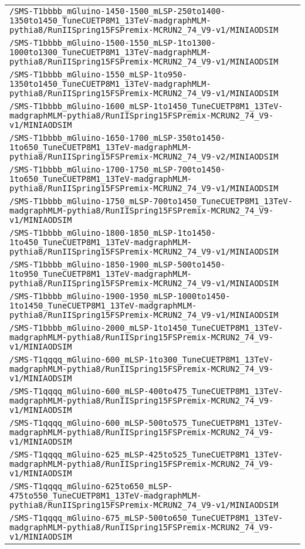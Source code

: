 \begin{center}
\begin{tabular}{l}
\verb!/SMS-T1bbbb_mGluino-1450-1500_mLSP-250to1400-1350to1450_TuneCUETP8M1_13TeV-madgraphMLM-pythia8/RunIISpring15FSPremix-MCRUN2_74_V9-v1/MINIAODSIM! \tabularnewline
\verb!/SMS-T1bbbb_mGluino-1500-1550_mLSP-1to1300-1000to1300_TuneCUETP8M1_13TeV-madgraphMLM-pythia8/RunIISpring15FSPremix-MCRUN2_74_V9-v1/MINIAODSIM! \tabularnewline
\verb!/SMS-T1bbbb_mGluino-1550_mLSP-1to950-1350to1450_TuneCUETP8M1_13TeV-madgraphMLM-pythia8/RunIISpring15FSPremix-MCRUN2_74_V9-v1/MINIAODSIM! \tabularnewline
\verb!/SMS-T1bbbb_mGluino-1600_mLSP-1to1450_TuneCUETP8M1_13TeV-madgraphMLM-pythia8/RunIISpring15FSPremix-MCRUN2_74_V9-v1/MINIAODSIM! \tabularnewline
\verb!/SMS-T1bbbb_mGluino-1650-1700_mLSP-350to1450-1to650_TuneCUETP8M1_13TeV-madgraphMLM-pythia8/RunIISpring15FSPremix-MCRUN2_74_V9-v2/MINIAODSIM! \tabularnewline
\verb!/SMS-T1bbbb_mGluino-1700-1750_mLSP-700to1450-1to650_TuneCUETP8M1_13TeV-madgraphMLM-pythia8/RunIISpring15FSPremix-MCRUN2_74_V9-v1/MINIAODSIM! \tabularnewline
\verb!/SMS-T1bbbb_mGluino-1750_mLSP-700to1450_TuneCUETP8M1_13TeV-madgraphMLM-pythia8/RunIISpring15FSPremix-MCRUN2_74_V9-v1/MINIAODSIM! \tabularnewline
\verb!/SMS-T1bbbb_mGluino-1800-1850_mLSP-1to1450-1to450_TuneCUETP8M1_13TeV-madgraphMLM-pythia8/RunIISpring15FSPremix-MCRUN2_74_V9-v1/MINIAODSIM! \tabularnewline
\verb!/SMS-T1bbbb_mGluino-1850-1900_mLSP-500to1450-1to950_TuneCUETP8M1_13TeV-madgraphMLM-pythia8/RunIISpring15FSPremix-MCRUN2_74_V9-v1/MINIAODSIM! \tabularnewline
\verb!/SMS-T1bbbb_mGluino-1900-1950_mLSP-1000to1450-1to1450_TuneCUETP8M1_13TeV-madgraphMLM-pythia8/RunIISpring15FSPremix-MCRUN2_74_V9-v1/MINIAODSIM! \tabularnewline
\verb!/SMS-T1bbbb_mGluino-2000_mLSP-1to1450_TuneCUETP8M1_13TeV-madgraphMLM-pythia8/RunIISpring15FSPremix-MCRUN2_74_V9-v1/MINIAODSIM! \tabularnewline
\verb!/SMS-T1qqqq_mGluino-600_mLSP-1to300_TuneCUETP8M1_13TeV-madgraphMLM-pythia8/RunIISpring15FSPremix-MCRUN2_74_V9-v1/MINIAODSIM! \tabularnewline
\verb!/SMS-T1qqqq_mGluino-600_mLSP-400to475_TuneCUETP8M1_13TeV-madgraphMLM-pythia8/RunIISpring15FSPremix-MCRUN2_74_V9-v1/MINIAODSIM! \tabularnewline
\verb!/SMS-T1qqqq_mGluino-600_mLSP-500to575_TuneCUETP8M1_13TeV-madgraphMLM-pythia8/RunIISpring15FSPremix-MCRUN2_74_V9-v1/MINIAODSIM! \tabularnewline
\verb!/SMS-T1qqqq_mGluino-625_mLSP-425to525_TuneCUETP8M1_13TeV-madgraphMLM-pythia8/RunIISpring15FSPremix-MCRUN2_74_V9-v1/MINIAODSIM! \tabularnewline
\verb!/SMS-T1qqqq_mGluino-625to650_mLSP-475to550_TuneCUETP8M1_13TeV-madgraphMLM-pythia8/RunIISpring15FSPremix-MCRUN2_74_V9-v1/MINIAODSIM! \tabularnewline
\verb!/SMS-T1qqqq_mGluino-675_mLSP-500to650_TuneCUETP8M1_13TeV-madgraphMLM-pythia8/RunIISpring15FSPremix-MCRUN2_74_V9-v1/MINIAODSIM! \tabularnewline

\end{tabular}
\end{center}
